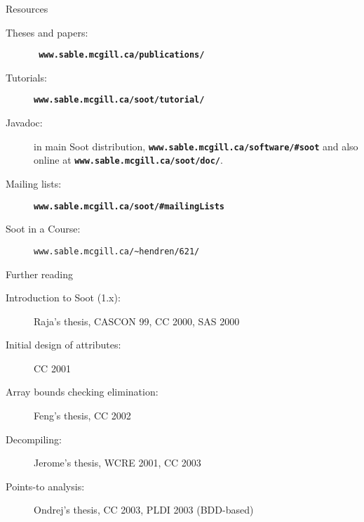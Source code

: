 \begin{slide}{Resources}
\begin{small}
\begin{description}
\item[Theses and papers:] \textbf{\texttt{ www.sable.mcgill.ca/publications/}}
\item[Tutorials:] \textbf{\texttt{www.sable.mcgill.ca/soot/tutorial/}}
\item[Javadoc:] in main Soot distribution, 
\textbf{\texttt{www.sable.mcgill.ca/software/\#soot}}
and also online at \textbf{\texttt{www.sable.mcgill.ca/soot/doc/}}.
\item[Mailing lists:] \textbf{\texttt{www.sable.mcgill.ca/soot/\#mailingLists}}
\item[Soot in a Course:] \verb+www.sable.mcgill.ca/~hendren/621/+
\end{description}
\end{small}
\end{slide}

\begin{slide}{Further reading}
\begin{description}
\item [Introduction to Soot (1.x):]  
Raja's thesis, CASCON 99, CC 2000, SAS 2000
\item [Initial design of attributes:] CC 2001
\item [Array bounds checking elimination:] Feng's thesis, CC 2002
\item [Decompiling:] Jerome's thesis, WCRE 2001, CC 2003
\item [Points-to analysis:] Ondrej's thesis, CC 2003, PLDI 2003 (BDD-based)
\end{description}
\end{slide}
